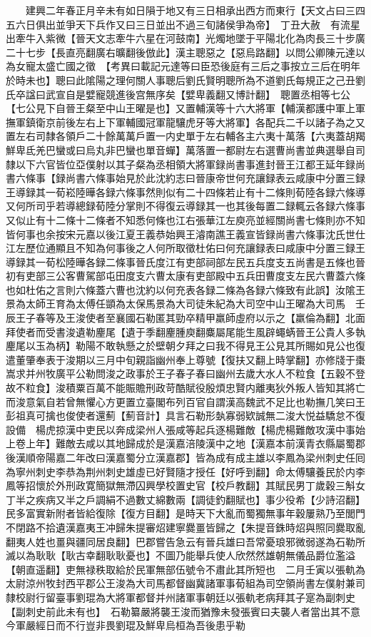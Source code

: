 　　建興二年春正月辛未有如日隕于地又有三日相承出西方而東行【天文占曰三四五六日俱出並爭天下兵作又曰三日並出不過三旬諸侯爭為帝】　丁丑大赦　有流星出牽牛入紫微【晉天文志牽牛六星在河鼓南】光燭地墜于平陽北化為肉長三十步廣二十七步【長直亮翻廣右曠翻後倣此】漢主聰惡之【惡烏路翻】以問公卿陳元達以為女寵太盛亡國之徵　【考異曰載記元達等曰臣恐後庭有三后之事按立三后在明年於時未也】聰曰此隂陽之理何關人事聰后劉氏賢明聰所為不道劉氏每規正之己丑劉氏卒諡曰武宣自是嬖寵競進後宫無序矣【嬖卑義翻又博計翻】　聰置丞相等七公【七公見下自晉王粲至中山王曜是也】又置輔漢等十六大將軍【輔漢都護中軍上軍撫軍鎮衛京前後左右上下軍輔國冠軍龍驤虎牙等大將軍】各配兵二千以諸子為之又置左右司隸各領戶二十餘萬萬戶置一内史單于左右輔各主六夷十萬落【六夷蓋胡羯鮮卑氐羌巴蠻或曰烏丸非巴蠻也單音蟬】萬落置一都尉左右選曹尚書並典選舉自司隸以下六官皆位亞僕射以其子粲為丞相領大將軍録尚書事進封晉王江都王延年録尚書六條事【録尚書六條事始見於此沈約志曰晉康帝世何充讓録表云咸康中分置三録王導録其一荀崧陸曄各録六條事然則似有二十四條若止有十二條則荀陸各録六條導又何所司乎若導總録荀陸分掌則不得復云導録其一也其後每置二録輒云各録六條事又似止有十二條十二條者不知悉何條也江右張華江左庾亮並經關尚書七條則亦不知皆何事也余按宋元嘉以後江夏王義恭始興王濬南譙王義宣皆録尚書六條事沈氏世仕江左歷位通顯且不知為何事後之人何所取徵杜佑曰何充讓録表曰咸康中分置三録王導録其一荀松陸曄各録二條事晉氏度江有吏部祠部左民五兵度支五尚書是五條也晉初有吏部三公客曹駕部屯田度支六曹太康有吏部殿中五兵田曹度支左民六曹蓋六條也如杜佑之言則六條蓋六曹也沈約以何充表各録二條為各録六條致有此誤】汝隂王景為太師王育為太傅任顗為太保馬景為大司徒朱紀為大司空中山王曜為大司馬　壬辰王子春等及王浚使者至襄國石勒匿其勁卒精甲羸師虛府以示之【羸倫為翻】北面拜使者而受書浚遺勒麈尾【遺于季翻麈腫庾翻麋屬尾能生風辟蠅蜹晉王公貴人多執麈尾以玉為柄】勒陽不敢執懸之於壁朝夕拜之曰我不得見王公見其所賜如見公也復遣董肇奉表于浚期以三月中旬親詣幽州奉上尊號【復扶又翻上時掌翻】亦修牋于棗嵩求并州牧廣平公勒問浚之政事於王子春子春曰幽州去歲大水人不粒食【五穀不登故不粒食】浚積粟百萬不能賑贍刑政苛酷賦役殷煩忠賢内離夷狄外叛人皆知其將亡而浚意氣自若曾無懼心方更置立臺閣布列百官自謂漢高魏武不足比也勒撫几笑曰王彭祖真可擒也俊使者還薊【薊音計】具言石勒形埶寡弱欵誠無二浚大悦益驕怠不復設備　楊虎掠漢中吏民以奔成梁州人張咸等起兵逐楊難敵【楊虎楊難敵攻漢中事始上卷上年】難敵去咸以其地歸成於是漢嘉涪陵漢中之地【漢嘉本前漢青衣縣屬蜀郡後漢順帝陽嘉二年改曰漢嘉蜀分立漢嘉郡】皆為成有成主雄以李鳳為梁州刺史任囘為寧州刺史李恭為荆州刺史雄虛已好賢隨才授任【好呼到翻】命太傅驤養民於内李鳳等招懷於外刑政寛簡獄無滯囚興學校置史官【校戶教翻】其賦民男丁歲穀三斛女丁半之疾病又半之戶調絹不過數丈綿數兩【調徒釣翻賦也】事少役希【少詩沼翻】民多富實新附者皆給復除【復方目翻】是時天下大亂而蜀獨無事年穀屢熟乃至閭門不閉路不拾遺漢嘉夷王冲歸朱提審炤建寧爨畺皆歸之【朱提音銖時炤與照同爨取亂翻夷人姓也畺與疆同居良翻】巴郡嘗告急云有晉兵雄曰吾常憂琅邪微弱遂為石勒所滅以為耿耿【耿古幸翻耿耿憂也】不圖乃能舉兵使人欣然然雄朝無儀品爵位濫溢【朝直遥翻】吏無禄秩取給於民軍無部伍號令不肅此其所短也　二月壬寅以張軌為太尉涼州牧封西平郡公王浚為大司馬都督幽冀諸軍事荀組為司空領尚書左僕射兼司隸校尉行留臺事劉琨為大將軍都督并州諸軍事朝廷以張軌老病拜其子寔為副刺史【副刺史前此未有也】　石勒纂嚴將襲王浚而猶豫未發張賓曰夫襲人者當出其不意今軍嚴經日而不行豈非畏劉琨及鮮卑烏桓為吾後患乎勒
